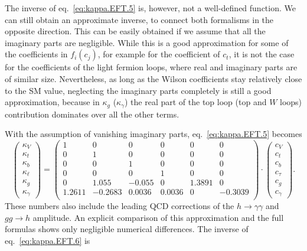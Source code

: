 The inverse of eq.~\eqref{eq:kappa.EFT.5} is, however, not a well-defined function. We can still obtain an approximate inverse, to connect both formalisms in the opposite direction. This can be easily obtained if we assume that all the imaginary parts are negligible. While this is a good approximation for some of the coefficients in $f_i(c_{j})$, for example for the coefficient of $c_{t}$, it is not the case for the coefficients of the light fermion loops, where real and imaginary parts are of similar size. Nevertheless, as long as the Wilson coefficients stay relatively close to the SM value, neglecting the imaginary parts completely is still a good approximation, because in $\kappa_g$ ($\kappa_\gamma$) the real part of the top loop (top and $W$ loops) contribution dominates over all the other terms.

With the assumption of vanishing imaginary parts, eq.~\eqref{eq:kappa.EFT.5} becomes
\begin{equation}
  \label{eq:kappa.EFT.6}
  \begin{pmatrix}
    \kappa_{V}\\
    \kappa_{t}\\
    \kappa_{b}\\
    \kappa_{\ell}\\
    \kappa_{g}\\
    \kappa_{\gamma}
  \end{pmatrix}
  = 
  \begin{pmatrix}
    1 & 0 & 0 & 0 & 0 & 0 \\
    0 & 1 & 0 & 0 & 0 & 0 \\
    0 & 0 & 1 & 0 & 0 & 0 \\
    0 & 0 & 0 & 1 & 0 & 0 \\
    0 & 1.055 & -0.055 & 0 & 1.3891 & 0 \\
    1.2611 & -0.2683 & 0.0036 & 0.0036 & 0 & -0.3039 \\
  \end{pmatrix}
  \cdot
  \begin{pmatrix}
    c_{V}\\
    c_{t}\\
    c_{b}\\
    c_{\tau}\\
    c_{g}\\
    c_{\gamma}
  \end{pmatrix}.
\end{equation}
%
These numbers also include the leading QCD corrections of the $h\to \gamma\gamma$ and $gg\to h$ amplitude. An explicit comparison of this approximation and the full formulas shows only negligible numerical differences. The inverse of eq.~\eqref{eq:kappa.EFT.6} is

